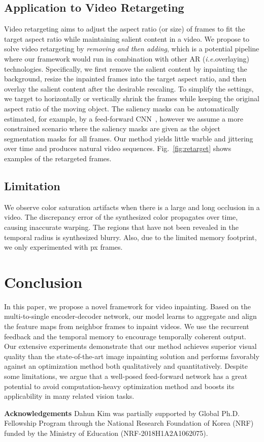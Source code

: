 \documentclass[10pt,twocolumn,letterpaper]{article}
\newcommand{\figref}[1]{Fig.~\ref{#1}}
\renewcommand{\paragraph}[1]{\vspace{1mm}\noindent\textbf{#1}}
\renewcommand{\ie}{\textit{i.e.}}
\begin{document}
\subsection{Application to Video Retargeting}
Video retargeting aims to adjust the aspect ratio (or size) of frames to fit the target aspect ratio while maintaining salient content in a video. We propose to solve video retargeting by \textit{removing and then adding}, which is a potential pipeline where our framework would run in combination with other AR (\ie overlaying) technologies. Specifically, we first remove the salient content by inpainting the background, resize the inpainted frames into the target aspect ratio, and then overlay the salient content after the desirable rescaling. To simplify the settings, we target to horizontally or vertically shrink the frames while keeping the original aspect ratio of the moving object. The saliency masks can be automatically estimated, for example, by a feed-forward CNN~\cite{cho2017weakly}, however we assume a more constrained scenario where the saliency masks are given as the object segmentation masks for all frames. Our method yields little warble and jittering over time and produces natural video sequences. \figref{fig:retarget} shows examples of the retargeted frames.










\subsection{Limitation}
We observe color saturation artifacts when there is a large and long occlusion in a video. The discrepancy error of the synthesized color propagates over time, causing inaccurate warping. The regions that have not been revealed in the temporal radius is synthesized blurry. Also, due to the limited memory footprint, we only experimented with  px frames.

\section{Conclusion}
In this paper, we propose a novel framework for video inpainting. Based on the multi-to-single encoder-decoder network, our model learns to aggregate and align the feature maps from neighbor frames to inpaint videos. We use the recurrent feedback and the temporal memory to encourage temporally coherent output. Our extensive experiments demonstrate that our method achieves superior visual quality than the state-of-the-art image inpainting solution and performs favorably against an optimization method both qualitatively and quantitatively. Despite some limitations, we argue that a well-posed feed-forward network has a great potential to avoid computation-heavy optimization method and boosts its applicability in many related vision tasks.



\paragraph{Acknowledgements}
Dahun Kim was partially supported by Global Ph.D. Fellowship Program through the National Research Foundation of Korea (NRF) funded by the Ministry of Education (NRF-2018H1A2A1062075).


{\small


}
\end{document}
